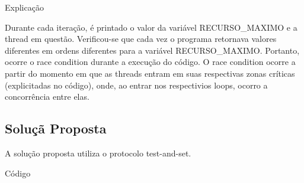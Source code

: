 Explicação

Durante cada iteração, é printado o valor da variável RECURSO\_MAXIMO e a thread em questão. 
Verificou-se que cada vez o programa retornava valores diferentes em ordens diferentes para a variável RECURSO\_MAXIMO. Portanto, ocorre o race condition durante a execução do código.
O race condition ocorre a partir do momento em que as threads entram em suas respectivas zonas críticas (explicitadas no código), onde, ao entrar nos respectivios loops, ocorro a concorrência entre elas.

\subsection*{Soluçã Proposta}
A solução proposta utiliza o protocolo test-and-set.

Código


